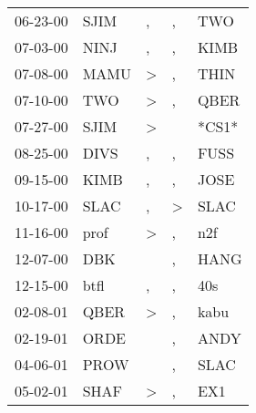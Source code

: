 \begin{supertabular}{p{0.07\textwidth}p{0.06\textwidth}p{0.02\textwidth}p{0.02\textwidth}p{0.06\textwidth}}
 06-23-00\textsuperscript{} &           SJIM\textsuperscript{} &             , &             , &            TWO\textsuperscript{} \\
 07-03-00\textsuperscript{} &           NINJ\textsuperscript{} &             , &             , &           KIMB\textsuperscript{} \\
 07-08-00\textsuperscript{} &           MAMU\textsuperscript{} &  \textgreater &             , &           THIN\textsuperscript{} \\
 07-10-00\textsuperscript{} &            TWO\textsuperscript{} &  \textgreater &             , &           QBER\textsuperscript{} \\
 07-27-00\textsuperscript{} &           SJIM\textsuperscript{} &  \textgreater &               &                            *CS1* \\
 08-25-00\textsuperscript{} &           DIVS\textsuperscript{} &             , &             , &           FUSS\textsuperscript{} \\
 09-15-00\textsuperscript{} &           KIMB\textsuperscript{} &             , &             , &           JOSE\textsuperscript{} \\
 10-17-00\textsuperscript{} &           SLAC\textsuperscript{} &             , &  \textgreater &           SLAC\textsuperscript{} \\
 11-16-00\textsuperscript{} &           prof\textsuperscript{} &  \textgreater &             , &            n2f\textsuperscript{} \\
 12-07-00\textsuperscript{} &            DBK\textsuperscript{} &               &             , &           HANG\textsuperscript{} \\
 12-15-00\textsuperscript{} &           btfl\textsuperscript{} &             , &             , &            40s\textsuperscript{} \\
 02-08-01\textsuperscript{} &           QBER\textsuperscript{} &  \textgreater &             , &           kabu\textsuperscript{} \\
 02-19-01\textsuperscript{} &           ORDE\textsuperscript{} &               &             , &           ANDY\textsuperscript{} \\
 04-06-01\textsuperscript{} &           PROW\textsuperscript{} &               &             , &           SLAC\textsuperscript{} \\
 05-02-01\textsuperscript{} &           SHAF\textsuperscript{} &  \textgreater &             , &            EX1\textsuperscript{} \\

\end{supertabular}

